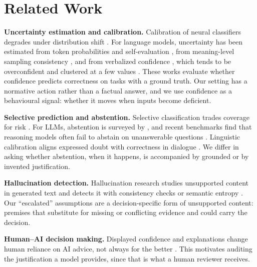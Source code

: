 \section{Related Work}
\textbf{Uncertainty estimation and calibration.} Calibration of neural classifiers \cite{guo2017calibration} degrades under distribution shift \cite{ovadia2019trust}. For language models, uncertainty has been estimated from token probabilities and self-evaluation \cite{kadavath2022know}, from meaning-level sampling consistency \cite{kuhn2023semantic,farquhar2024semantic}, and from verbalized confidence \cite{lin2022teaching,tian2023justask,xiong2024express}, which tends to be overconfident and clustered at a few values \cite{xiong2024express}. These works evaluate whether confidence predicts correctness on tasks with a ground truth. Our setting has a normative action rather than a factual answer, and we use confidence as a behavioural signal: whether it moves when inputs become deficient.

\textbf{Selective prediction and abstention.} Selective classification trades coverage for risk \cite{elyaniv2010foundations,geifman2017selective}. For LLMs, abstention is surveyed by \cite{wen2025abstention}, and recent benchmarks find that reasoning models often fail to abstain on unanswerable questions \cite{kirichenko2025abstentionbench}. Linguistic calibration aligns expressed doubt with correctness in dialogue \cite{mielke2022reducing}. We differ in asking whether abstention, when it happens, is accompanied by grounded or by invented justification.

\textbf{Hallucination detection.} Hallucination research studies unsupported content in generated text \cite{ji2023survey} and detects it with consistency checks \cite{manakul2023selfcheck} or semantic entropy \cite{farquhar2024semantic}. Our ``escalated'' assumptions are a decision-specific form of unsupported content: premises that substitute for missing or conflicting evidence and could carry the decision.

\textbf{Human--AI decision making.} Displayed confidence and explanations change human reliance on AI advice, not always for the better \cite{zhang2020confidence}. This motivates auditing the justification a model provides, since that is what a human reviewer receives.

